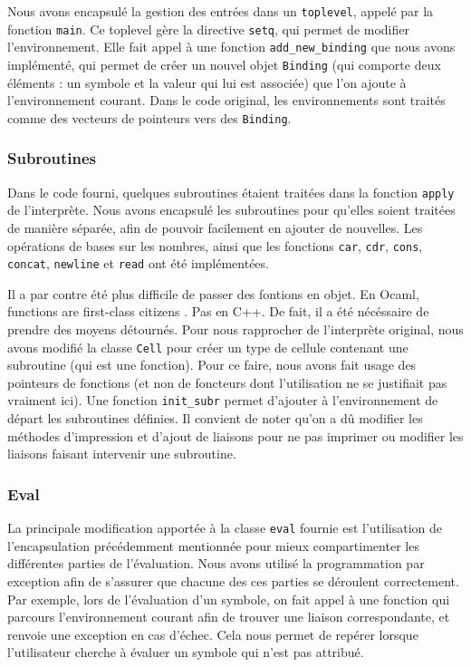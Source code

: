 \documentclass[a4paper,11pt]{article}
\begin{document}
  Nous avons encapsulé la gestion des entrées dans un \texttt{toplevel}, 
 appelé par la fonction \texttt{main}. Ce toplevel gère la directive \texttt{setq}, qui
 permet de modifier l'environnement. 
 Elle fait appel à une fonction \texttt{add\_new\_binding} que nous avons
 implémenté, qui permet de créer un nouvel objet
  \texttt{Binding} (qui comporte deux éléments : un
 symbole et la valeur qui lui est associée) que l'on ajoute à l'environnement courant. 
 Dans le code original, les environnements sont traités comme des vecteurs de pointeurs 
 vers des
 \texttt{Binding}.

 \subsubsection{Subroutines}
 
  Dans le code fourni, quelques subroutines étaient traitées dans la fonction 
  \texttt{apply} de l'interprète. Nous avons encapsulé les subroutines pour qu'elles soient 
  traitées de manière séparée, afin de pouvoir facilement en ajouter de nouvelles. 
  Les opérations de bases sur les nombres, ainsi que les fonctions \texttt{car}, 
  \texttt{cdr}, \texttt{cons}, \texttt{concat}, \texttt{newline} et \texttt{read} 
  ont été implémentées.

  Il a par contre été plus difficile de passer des fontions en objet. En Ocaml,
  \og functions are first-class citizens \fg. Pas en C++. De fait, il a été
  nécéssaire de prendre des moyens détournés.
  Pour nous rapprocher de l'interprète original, nous avons modifié la classe
  \texttt{Cell} pour créer un type de cellule contenant une subroutine (qui est
  une fonction). Pour ce faire, nous avons fait usage des pointeurs de fonctions
  (et non de foncteurs dont l'utilisation ne se justifiait pas vraiment ici).
  Une fonction \texttt{init\_subr} permet d'ajouter à l'environnement de départ
  les subroutines définies. Il convient de noter qu'on a dû modifier les
  méthodes d'impression et d'ajout de liaisons pour ne pas imprimer ou modifier 
  les liaisons faisant
  intervenir une subroutine.
  
 \subsubsection{Eval}
 
 La principale modification apportée à la classe \texttt{eval} fournie est 
l'utilisation de l'encapsulation précédemment mentionnée pour mieux compartimenter 
les différentes parties de l'évaluation. Nous avons utilisé la programmation 
par exception afin de s'assurer que chacune des ces parties se déroulent 
correctement. Par exemple, lors de l'évaluation d'un symbole, on fait appel 
à une fonction qui parcours l'environnement courant afin de trouver une liaison 
correspondante, et renvoie une exception en cas d'échec. Cela nous permet de 
repérer lorsque l'utilisateur cherche à évaluer un symbole qui n'est pas attribué.
\end{document}
